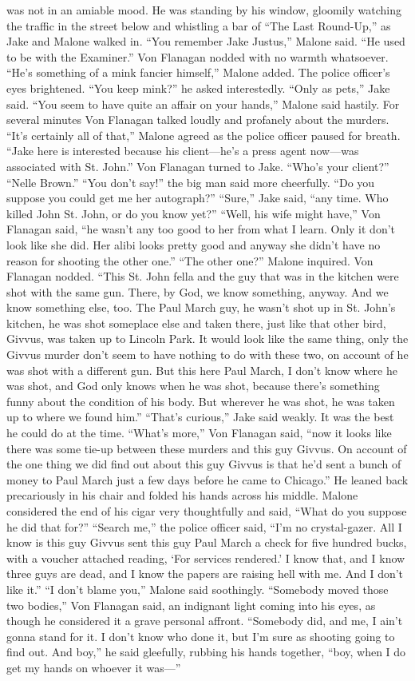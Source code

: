 \documentclass{novel}
\begin{document}
was not in an amiable mood. He was standing by his window, gloomily watching the traffic in the street below and whistling a bar of “The Last Round-Up,” as Jake and Malone walked in. “You remember Jake Justus,” Malone said. “He used to be with the Examiner.” Von Flanagan nodded with no warmth whatsoever. “He’s something of a mink fancier himself,” Malone added. The police officer’s eyes brightened. “You keep mink?” he asked interestedly. “Only as pets,” Jake said. “You seem to have quite an affair on your hands,” Malone said hastily. For several minutes Von Flanagan talked loudly and profanely about the murders. “It’s certainly all of that,” Malone agreed as the police officer paused for breath. “Jake here is interested because his client—he’s a press agent now—was associated with St. John.” Von Flanagan turned to Jake. “Who’s your client?” “Nelle Brown.” “You don’t say!” the big man said more cheerfully. “Do you suppose you could get me her autograph?” “Sure,” Jake said, “any time. Who killed John St. John, or do you know yet?” “Well, his wife might have,” Von Flanagan said, “he wasn’t any too good to her from what I learn. Only it don’t look like she did. Her alibi looks pretty good and anyway she didn’t have no reason for shooting the other one.” “The other one?” Malone inquired. Von Flanagan nodded. “This St. John fella and the guy that was in the kitchen were shot with the same gun. There, by God, we know something, anyway. And we know something else, too. The Paul March guy, he wasn’t shot up in St. John’s kitchen, he was shot someplace else and taken there, just like that other bird, Givvus, was taken up to Lincoln Park. It would look like the same thing, only the Givvus murder don’t seem to have nothing to do with these two, on account of he was shot with a different gun. But this here Paul March, I don’t know where he was shot, and God only knows when he was shot, because there’s something funny about the condition of his body. But wherever he was shot, he was taken up to where we found him.” “That’s curious,” Jake said weakly. It was the best he could do at the time. “What’s more,” Von Flanagan said, “now it looks like there was some tie-up between these murders and this guy Givvus. On account of the one thing we did find out about this guy Givvus is that he’d sent a bunch of money to Paul March just a few days before he came to Chicago.” He leaned back precariously in his chair and folded his hands across his middle. Malone considered the end of his cigar very thoughtfully and said, “What do you suppose he did that for?” “Search me,” the police officer said, “I’m no crystal-gazer. All I know is this guy Givvus sent this guy Paul March a check for five hundred bucks, with a voucher attached reading, ‘For services rendered.’ I know that, and I know three guys are dead, and I know the papers are raising hell with me. And I don’t like it.” “I don’t blame you,” Malone said soothingly. “Somebody moved those two bodies,” Von Flanagan said, an indignant light coming into his eyes, as though he considered it a grave personal affront. “Somebody did, and me, I ain’t gonna stand for it. I don’t know who done it, but I’m sure as shooting going to find out. And boy,” he said gleefully, rubbing his hands together, “boy, when I do get my hands on whoever it was—”
\end{document}

